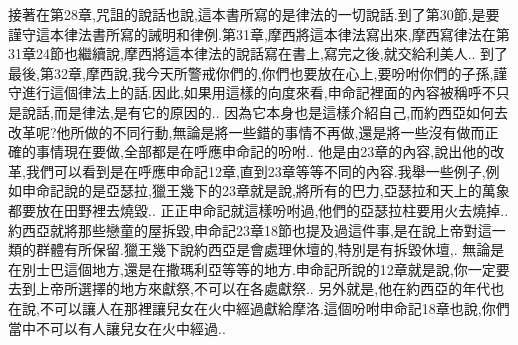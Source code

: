 \documentclass{book}
\begin{document}
接著在第28章,咒詛的說話也說,這本書所寫的是律法的一切說話.到了第30節,是要謹守這本律法書所寫的誡明和律例.第31章,摩西將這本律法寫出來,摩西寫律法在第31章24節也繼續說,摩西將這本律法的說話寫在書上,寫完之後,就交給利美人..
到了最後,第32章,摩西說,我今天所警戒你們的,你們也要放在心上,要吩咐你們的子孫,謹守進行這個律法上的話.因此,如果用這樣的向度來看,申命記裡面的內容被稱呼不只是說話,而是律法,是有它的原因的..
因為它本身也是這樣介紹自己,而約西亞如何去改革呢?他所做的不同行動,無論是將一些錯的事情不再做,還是將一些沒有做而正確的事情現在要做,全部都是在呼應申命記的吩咐..
他是由23章的內容,說出他的改革,我們可以看到是在呼應申命記12章,直到23章等等不同的內容.我舉一些例子,例如申命記說的是亞瑟拉,獵王幾下的23章就是說,將所有的巴力,亞瑟拉和天上的萬象都要放在田野裡去燒毀..
正正申命記就這樣吩咐過,他們的亞瑟拉柱要用火去燒掉..
約西亞就將那些戀童的屋拆毀,申命記23章18節也提及過這件事,是在說上帝對這一類的群體有所保留.獵王幾下說約西亞是會處理休壇的,特別是有拆毀休壇,.
無論是在別士巴這個地方,還是在撒瑪利亞等等的地方.申命記所說的12章就是說,你一定要去到上帝所選擇的地方來獻祭,不可以在各處獻祭..
另外就是,他在約西亞的年代也在說,不可以讓人在那裡讓兒女在火中經過獻給摩洛.這個吩咐申命記18章也說,你們當中不可以有人讓兒女在火中經過..
\end{document}
